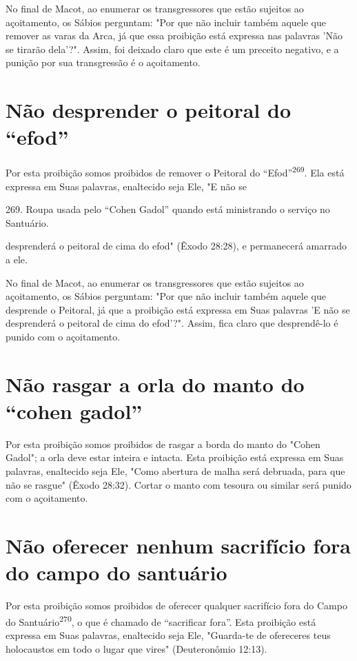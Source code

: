 No final de Macot, ao enumerar os transgressores que estão sujeitos ao
açoitamento, os Sábios perguntam: "Por que não incluir também aquele que
remover as varas da Arca, já que essa proibição está expressa nas
palavras 'Não se tirarão dela'?". Assim, foi deixado claro que este é um
preceito negativo, e a punição por sua transgressão é o açoitamento.

\section{Não desprender o peitoral do ``efod''}

Por esta proibição somos proibidos de remover o Peitoral do
``Efod''\textsuperscript{269}. Ela está expressa em Suas palavras,
enaltecido seja Ele, "E não se

269. Roupa usada pelo ``Cohen Gadol'' quando está ministrando o serviço no
Santuário.

desprenderá o peitoral de cima do efod" (Êxodo 28:28), e permanecerá
amar­rado a ele.

No final de Macot, ao enumerar os transgressores que estão sujeitos ao
açoitamento, os Sábios perguntam: "Por que não incluir também aquele que
desprende o Peitoral, já que a proibição está expressa em Suas palavras
'E não se desprenderá o peitoral de cima do efod'?". Assim, fica claro
que desprendê-lo é punido com o açoitamento.

\section{Não rasgar a orla do manto do ``cohen gadol''}

Por esta proibição somos proibidos de rasgar a borda do manto do "Cohen
Gadol"; a orla deve estar inteira e intacta. Esta proibição está
expressa em Suas palavras, enaltecido seja Ele, "Como abertura de malha
será debruada, para que não se rasgue" (Êxodo 28:32). Cortar o manto com
tesoura ou similar será punido com o açoitamento.

\section{Não oferecer nenhum sacrifício fora do campo do santuário}

Por esta proibição somos proibidos de oferecer qualquer sacrifício fora
do Campo do Santuário\textsuperscript{270}, o que é chamado de
``sacrificar fora''. Esta proibição está expressa em Suas palavras,
enaltecido seja Ele, "Guarda-te de ofe­receres teus holocaustos em todo
o lugar que vires" (Deuteronômio 12:13).

